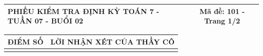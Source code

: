 \documentclass[12pt,a4paper]{article}
\begin{document}
\pagestyle{empty}

\noindent
\begin{tabularx}{\linewidth}{|X|c|}
\hline
\textbf{PHIẾU KIỂM TRA ĐỊNH KỲ TOÁN 7 - TUẦN 07 - BUỔI 02} & \textbf{Mã đề: 101 - Trang 1/2} \\
\hline
\end{tabularx}

\vspace{1.2mm}

\noindent
\begin{tabularx}{\linewidth}{|p{3.2cm}|X|}
\hline
\centering\textbf{ĐIỂM SỐ} & \centering\textbf{LỜI NHẬN XÉT CỦA THẦY CÔ} \tabularnewline
\hline
\rule{0pt}{1.8cm} & \tabularnewline
\hline
\end{tabularx}

\vspace{1.2mm}
\end{document}
